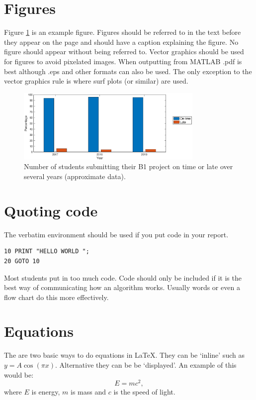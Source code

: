 \documentclass[11pt]{article}
\begin{document}
\section{Figures}

Figure \ref{fig:examplebargraph} is an example figure. Figures should be referred to in the text before they appear on the page and should have a caption explaining the figure. No figure should appear without being referred to. Vector graphics should be used for figures to avoid  pixelated images. When outputting from MATLAB .pdf is best although .eps and other formats can also be used. The only exception to the vector graphics rule is where surf plots (or similar) are used.

\begin{figure}
\centering
\includegraphics[width=0.8\textwidth]{asimplebarchart.eps}
\caption{Number of students submitting their B1 project on time or late over several years (approximate data).}
\label{fig:examplebargraph}
\end{figure}

\section{Quoting code}
The verbatim environment should be used if you put code in your report.
\begin{verbatim}
10 PRINT "HELLO WORLD ";
20 GOTO 10
\end{verbatim}
Most students put in too much code. Code should only be included if it is the best way of communicating how an algorithm works. Usually words or even a flow chart do this more effectively.

\section{Equations}
The are two basic ways to do equations in \LaTeX. They can be `inline' such as $y=A\cos\left(\pi x\right)$. Alternative they can be be `displayed'. An example of this would be:
\begin{equation}
    E=mc^2,
    \label{eq:Einstien}
\end{equation}
where $E$ is energy, $m$ is mass and $c$ is the speed of light.
\end{document}
